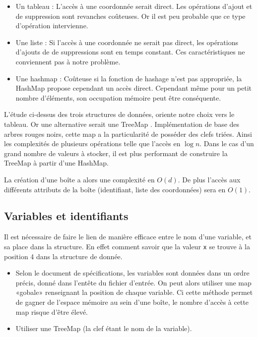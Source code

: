 \begin{itemize}
 \item
Un tableau : L'accès à une coordonnée serait direct. Les opérations d'ajout et de suppression sont revanches coûteuses. Or il est peu probable que ce type d'opération intervienne.
\item
Une liste : Si l'accès à une coordonnée ne serait pas direct, les opérations d'ajouts de de suppressions sont en temps constant. Ces caractéristiques ne conviennent pas à notre problème.
\item
Une hashmap : Coûteuse si la fonction de hashage n'est pas appropriée, la HashMap propose cependant un accès direct. Cependant même pour un petit nombre d'éléments, son occupation mémoire peut être conséquente. 
\end{itemize}
L'étude ci-dessus des trois structures de données, oriente notre choix vers le tableau. Or une alternative serait une TreeMap \cite{TreeMap}. 
Implémentation de base des arbres rouges noirs, cette map a la particularité de posséder des clefs triées. Ainsi les complexités de plusieurs opérations telle que l'accès en $\log{n}$. Dans le cas d'un grand nombre de valeurs à stocker, il est plus performant de construire la TreeMap à partir d'une HashMap.

La création d'une boîte a alors une complexité en $O(d)$. De plus l'accès aux différents attributs de la boîte (identifiant, liste des coordonnées) sera en $O(1)$.

\subsection{Variables et identifiants}
Il est nécessaire de faire le lien de manière efficace entre le nom d'une variable, et sa place dans la structure. En effet comment savoir que la valeur \verb+x+ se trouve à la position 4 dans la structure de donnée.
\begin{itemize}
\item
Selon le document de spécifications, les variables sont données dans un ordre précis, donné dans l'entête du fichier d'entrée. On peut alors utiliser une map «gobale» renseignant la position de chaque variable. Ci cette méthode permet de gagner de l'espace mémoire au sein d'une boîte, le nombre d'accès à cette map risque d'être élevé.
\item
Utiliser une TreeMap (la clef étant le nom de la variable).
\end{itemize} 

